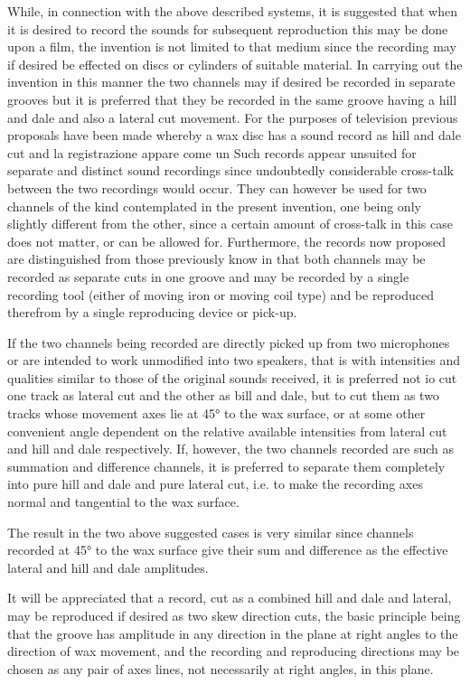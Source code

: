 \documentclass[11pt]{article}
\begin{document}
\begin{multicols*}{2}
While, in connection with the above described systems, it is suggested that when it is desired to record the sounds for subsequent reproduction this may be done upon a film, the invention is not limited to that medium since the recording may if desired be effected on discs or cylinders of suitable material. In carrying out the invention in this manner the two channels may if desired be recorded in separate grooves but it is preferred that they be recorded in the same groove having a hill and dale and also a lateral cut movement. For the purposes of television previous proposals have been made whereby a wax disc has a sound record as hill and dale cut and la registrazione appare come un Such records appear unsuited for separate and distinct sound recordings since undoubtedly considerable cross-talk between the two recordings would occur. They can however be used for two channels of the kind contemplated in the present invention, one being only slightly different from the other, since a certain amount of cross-talk in this case does not matter, or can be allowed for. Furthermore, the records now proposed are distinguished from those previously know in that both channels may be recorded as separate cuts in one groove and may be recorded by a single recording tool (either of moving iron or moving coil type) and be reproduced therefrom by a single reproducing device or pick-up. 

If the two channels being recorded are directly picked up from two microphones or are intended to work unmodified into two speakers, that is with intensities and qualities similar to those of the original sounds received, it is preferred not io cut one track as lateral cut and the other as bill and dale, but to cut them as two tracks whose movement axes lie at 45° to the wax surface, or at some other convenient angle dependent on the relative available intensities from lateral cut and hill and dale respectively. If, however, the two channels recorded are such as summation and difference channels, it is preferred to separate them completely into pure hill and dale and pure lateral cut, i.e. to make the recording axes normal and tangential to the wax surface.
 
The result in the two above suggested cases is very similar since channels recorded at 45° to the wax surface give their sum and difference as the effective lateral and hill and dale amplitudes.
 
It will be appreciated that a record, cut as a combined hill and dale and lateral, may be reproduced if desired as two skew direction cuts, the basic principle being that the groove has amplitude in any direction in the plane at right angles to the direction of wax movement, and the recording and reproducing directions may be chosen as any pair of axes lines, not necessarily at right angles, in this plane. 


\end{multicols*}
\end{document}
